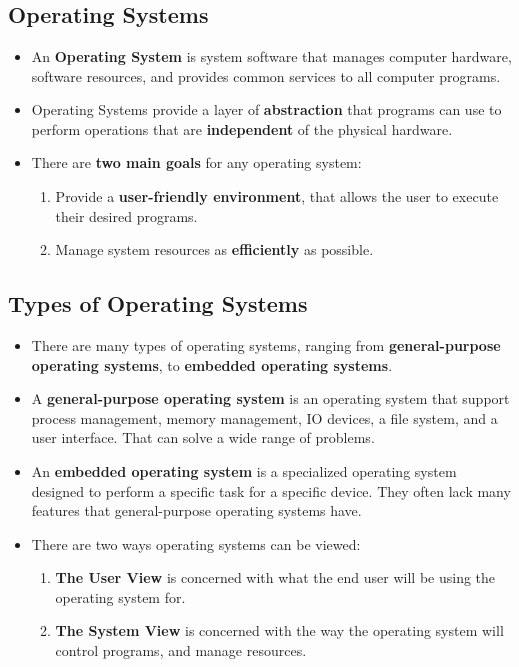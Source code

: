 \documentclass[16pt]{article}
\begin{document}
    \section*{}

    \subsection*{Operating Systems}
    \begin{itemize}
        \item An \textbf{Operating System} is system software that manages computer hardware, software resources, and provides common services to all computer programs.
        \item Operating Systems provide a layer of \textbf{abstraction} that programs can use to perform operations that are \textbf{independent} of the physical hardware.
        \item There are \textbf{two main goals} for any operating system:
        \begin{enumerate}
            \item Provide a \textbf{user-friendly environment}, that allows the user to execute their desired programs.
            \item Manage system resources as \textbf{efficiently} as possible.
        \end{enumerate}
    \end{itemize}
    
    \subsection*{Types of Operating Systems}
    \begin{itemize}
        \item There are many types of operating systems, ranging from \textbf{general-purpose operating systems}, to \textbf{embedded operating systems}.
        \item A \textbf{general-purpose operating system} is an operating system that support process management, memory management, IO devices, a file system, and a user interface. That can solve a wide range of problems.
        \item An \textbf{embedded operating system} is a specialized operating system designed to perform a specific task for a specific device. They often lack many features that general-purpose operating systems have. 
        \item There are two ways operating systems can be viewed:
        \begin{enumerate}
            \item \textbf{The User View} is concerned with what the end user will be using the operating system for.
            \item \textbf{The System View} is concerned with the way the operating system will control programs, and manage resources.
        \end{enumerate}
    \end{itemize}
    
\end{document}
